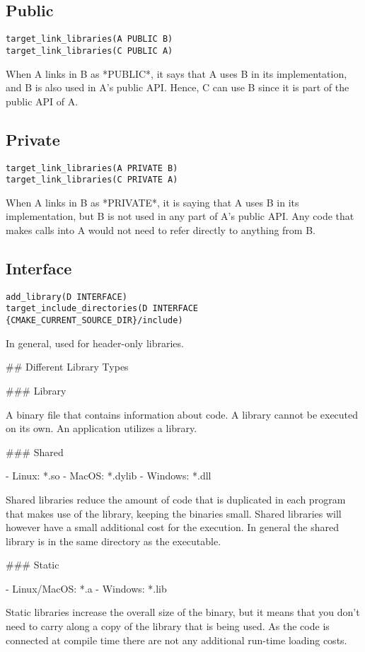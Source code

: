 \subsection{Public}

\begin{verbatim}
target_link_libraries(A PUBLIC B)
target_link_libraries(C PUBLIC A)
\end{verbatim}

When A links in B as *PUBLIC*, it says that A uses B in its implementation, and B is also used in A's public API. Hence, C can use B since it is part of the public API of A.

\subsection{Private}

\begin{verbatim}
target_link_libraries(A PRIVATE B)
target_link_libraries(C PRIVATE A)
\end{verbatim}


When A links in B as *PRIVATE*, it is saying that A uses B in its
implementation, but B is not used in any part of A's public API. Any code
that makes calls into A would not need to refer directly to anything from
B.

\subsection{Interface}

\begin{verbatim}
add_library(D INTERFACE)
target_include_directories(D INTERFACE {CMAKE_CURRENT_SOURCE_DIR}/include)
\end{verbatim}

In general, used for header-only libraries.

## Different Library Types

### Library

A binary file that contains information about code.
A library cannot be executed on its own.
An application utilizes a library.

### Shared

- Linux: *.so
- MacOS: *.dylib
- Windows: *.dll

Shared libraries reduce the amount of code that is duplicated in each program that makes use of the library, keeping the binaries small.
Shared libraries will however have a small additional cost for the execution.
In general the shared library is in the same directory as the executable.

### Static

- Linux/MacOS: *.a
- Windows: *.lib

Static libraries increase the overall size of the binary, but it means that you don't need to carry along a copy of the library that is being used.
As the code is connected at compile time there are not any additional run-time loading costs.
